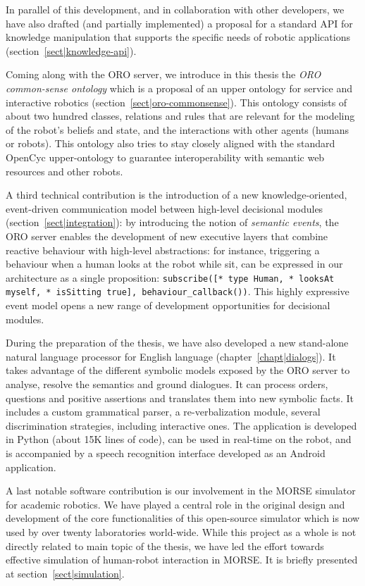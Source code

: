 In parallel of this development, and in collaboration with other developers, we
have also drafted (and partially implemented) a proposal for a standard API for
knowledge manipulation that supports the specific needs of robotic applications
(section~\ref{sect|knowledge-api}).

Coming along with the ORO server, we introduce in this thesis the \emph{ORO
common-sense ontology} which is a proposal of an upper ontology for service and
interactive robotics (section~\ref{sect|oro-commonsense}). This ontology
consists of about two hundred classes, relations and rules that are relevant
for the modeling of the robot's beliefs and state, and the interactions with
other agents (humans or robots). This ontology also tries to stay closely
aligned with the standard {\sc OpenCyc} upper-ontology to guarantee
interoperability with semantic web resources and other robots.

A third technical contribution is the introduction of a new knowledge-oriented,
event-driven communication model between high-level decisional modules
(section~\ref{sect|integration}): by introducing the notion of \emph{semantic
events}, the ORO server enables the development of new executive layers that
combine reactive behaviour with high-level abstractions: for instance,
triggering a behaviour when a human looks at the robot while sit, can be
expressed in our architecture as a single proposition: {\tt subscribe([* type
Human, * looksAt myself, * isSitting true], behaviour\_callback())}. This
highly expressive event model opens a new range of development opportunities for
decisional modules.

During the preparation of the thesis, we have also developed a new stand-alone
natural language processor for English language (chapter~\ref{chapt|dialogs}).
It takes advantage of the different symbolic models exposed by the ORO server
to analyse, resolve the semantics and ground dialogues. It can process orders,
questions and positive assertions and translates them into new symbolic facts.
It includes a custom grammatical parser, a re-verbalization module, several
discrimination strategies, including interactive ones. The application is
developed in Python (about 15K lines of code), can be used in real-time on the
robot, and is accompanied by a speech recognition interface developed as an
Android application.

A last notable software contribution is our involvement in the MORSE simulator
for academic robotics. We have played a central role in the original design and
development of the core functionalities of this open-source simulator which is
now used by over twenty laboratories world-wide. While this project as a whole
is not directly related to main topic of the thesis, we have led the effort
towards effective simulation of human-robot interaction in MORSE. It is briefly
presented at section~\ref{sect|simulation}.




